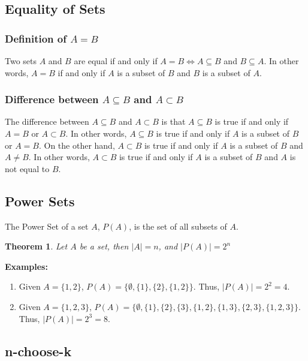 \documentclass{article}
\newtheorem*{thm}{Theorem}
\begin{document}
\subsection{Equality of Sets}

\subsubsection{Definition of $A = B$}

Two sets $A$ and $B$ are equal if and only if $A = B \iff A \subseteq B$ and $B \subseteq A$. In other words, $A = B$ if and only if $A$ is a subset of $B$ and $B$ is a subset of $A$.

\subsubsection{Difference between $A \subseteq B$ and $A \subset B$}

The difference between $A \subseteq B$ and $A \subset B$ is that $A \subseteq B$ is true if and only if $A = B$ or $A \subset B$. In other words, $A \subseteq B$ is true if and only if $A$ is a subset of $B$ or $A = B$. On the other hand, $A \subset B$ is true if and only if $A$ is a subset of $B$ and $A \neq B$. In other words, $A \subset B$ is true if and only if $A$ is a subset of $B$ and $A$ is not equal to $B$.

\subsection{Power Sets}

The Power Set of a set $A$, $P(A)$, is the set of all subsets of $A$.

\begin{thm}
    Let $A$ be a set, then $|A| = n$, and $|P(A)| = 2^n$
\end{thm}

\textbf{Examples:}
\begin{enumerate}
    \item Given $A = \{1, 2\}$, $P(A) = \{\emptyset, \{1\}, \{2\}, \{1, 2\}\}$. Thus, $|P(A)| = 2^2 = 4$.
    \item Given $A = \{1, 2, 3\}$, $P(A) = \{\emptyset, \{1\}, \{2\}, \{3\}, \{1, 2\}, \{1, 3\}, \{2, 3\}, \{1, 2, 3\}\}$. Thus, $|P(A)| = 2^3 = 8$.
\end{enumerate}

\subsection{n-choose-k}
\end{document}
